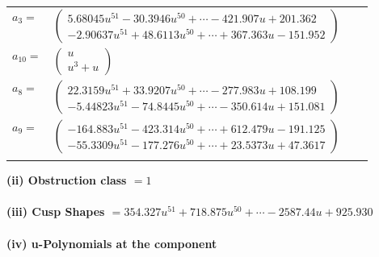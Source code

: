 \documentclass[1p]{elsarticle_modified}
\theoremstyle{definition}
\begin{document}
\begin{tabular}{m{7pt} m{180pt} m{7pt} m{180pt} }
\flushright $a_{3}=$&$\begin{pmatrix}5.68045 u^{51}-30.3946 u^{50}+\cdots-421.907 u+201.362\\-2.90637 u^{51}+48.6113 u^{50}+\cdots+367.363 u-151.952\end{pmatrix}$ \\
\flushright $a_{10}=$&$\begin{pmatrix}u\\u^3+u\end{pmatrix}$ \\
\flushright $a_{8}=$&$\begin{pmatrix}22.3159 u^{51}+33.9207 u^{50}+\cdots-277.983 u+108.199\\-5.44823 u^{51}-74.8445 u^{50}+\cdots-350.614 u+151.081\end{pmatrix}$ \\
\flushright $a_{9}=$&$\begin{pmatrix}-164.883 u^{51}-423.314 u^{50}+\cdots+612.479 u-191.125\\-55.3309 u^{51}-177.276 u^{50}+\cdots+23.5373 u+47.3617\end{pmatrix}$\\&\end{tabular}
\flushleft \textbf{(ii) Obstruction class $= 1$}\\~\\
\flushleft \textbf{(iii) Cusp Shapes $= 354.327 u^{51}+718.875 u^{50}+\cdots-2587.44 u+925.930$}\\~\\
\newpage\renewcommand{\arraystretch}{1}
\flushleft \textbf{(iv) u-Polynomials at the component}\newline \\
\end{document}

